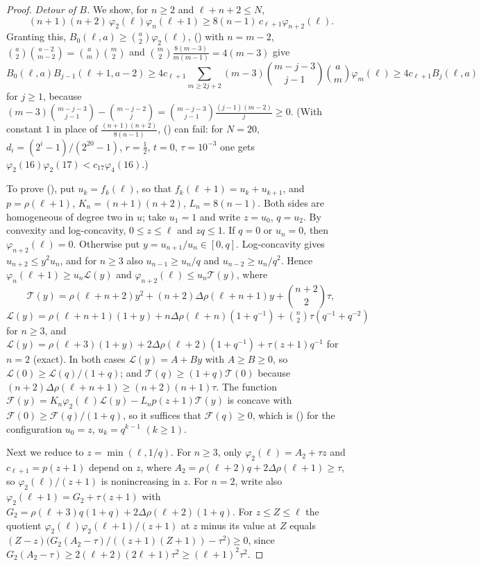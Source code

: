 \documentclass[twoside,10pt]{article}
\numberwithin{equation}{section}
\theoremstyle{slbody}
\theoremstyle{definition}
\theoremstyle{remark}
\renewcommand{\eqref}[1]{\textup{{\normalfont(\oldstylenums{\ref{#1}}}\normalfont)}}
\begin{document}
\begin{proof}
\emph{Detour of $B$.} We show, for $n\geq2$ and $\ell+n+2\leq N$,
\begin{equation}\label{eq:quad-B}
(n+1)(n+2)\,\varphi_2(\ell)\varphi_n(\ell+1)\geq8(n-1)\,c_{\ell+1}\varphi_{n+2}(\ell).
\end{equation}
Granting this, $B_0(\ell,a)\geq\binom a2\varphi_2(\ell)$, \eqref{eq:quad-B} with $n=m-2$, $\binom a2\binom{a-2}{m-2}=\binom am\binom m2$ and $\binom m2\frac{8(m-3)}{m(m-1)}=4(m-3)$ give
\[
B_0(\ell,a)B_{j-1}(\ell+1,a-2)\geq4c_{\ell+1}\sum_{m\geq2j+2}(m-3)\binom{m-j-3}{j-1}\binom am\varphi_m(\ell)\geq4c_{\ell+1}B_j(\ell,a)
\]
for $j\geq1$, because $(m-3)\binom{m-j-3}{j-1}-\binom{m-j-2}j=\binom{m-j-3}{j-1}\frac{(j-1)(m-2)}j\geq0$. (With constant $1$ in place of $\frac{(n+1)(n+2)}{8(n-1)}$, \eqref{eq:quad-B} can fail: for $N=20$, $d_i=(2^i-1)/(2^{20}-1)$, $r=\frac12$, $t=0$, $\tau=10^{-3}$ one gets $\varphi_2(16)\varphi_2(17)<c_{17}\varphi_4(16)$.)

To prove \eqref{eq:quad-B}, put $u_k=f_k(\ell)$, so that $f_k(\ell+1)=u_k+u_{k+1}$, and $p=\rho(\ell+1)$, $K_n=(n+1)(n+2)$, $L_n=8(n-1)$. Both sides are homogeneous of degree two in $u$; take $u_1=1$ and write $z=u_0$, $q=u_2$. By convexity and log-concavity, $0\leq z\leq\ell$ and $zq\leq1$. If $q=0$ or $u_n=0$, then $\varphi_{n+2}(\ell)=0$. Otherwise put $y=u_{n+1}/u_n\in[0,q]$. Log-concavity gives $u_{n+2}\leq y^2u_n$, and for $n\geq3$ also $u_{n-1}\geq u_n/q$ and $u_{n-2}\geq u_n/q^2$. Hence $\varphi_n(\ell+1)\geq u_n\mathcal L(y)$ and $\varphi_{n+2}(\ell)\leq u_n\mathcal T(y)$, where
\[
\mathcal T(y)=\rho(\ell+n+2)y^2+(n+2)\Delta\rho(\ell+n+1)y+\binom{n+2}2\tau,
\]
$\mathcal L(y)=\rho(\ell+n+1)(1+y)+n\Delta\rho(\ell+n)(1+q^{-1})+\binom n2\tau(q^{-1}+q^{-2})$ for $n\geq3$, and $\mathcal L(y)=\rho(\ell+3)(1+y)+2\Delta\rho(\ell+2)(1+q^{-1})+\tau(z+1)q^{-1}$ for $n=2$ (exact). In both cases $\mathcal L(y)=A+By$ with $A\geq B\geq0$, so $\mathcal L(0)\geq\mathcal L(q)/(1+q)$; and $\mathcal T(q)\geq(1+q)\mathcal T(0)$ because $(n+2)\Delta\rho(\ell+n+1)\geq(n+2)(n+1)\tau$. The function $\mathcal F(y)=K_n\varphi_2(\ell)\mathcal L(y)-L_np(z+1)\mathcal T(y)$ is concave with $\mathcal F(0)\geq\mathcal F(q)/(1+q)$, so it suffices that $\mathcal F(q)\geq0$, which is \eqref{eq:quad-B} for the configuration $u_0=z$, $u_k=q^{k-1}$ $(k\geq1)$.

Next we reduce to $z=\min(\ell,1/q)$. For $n\geq3$, only $\varphi_2(\ell)=A_2+\tau z$ and $c_{\ell+1}=p(z+1)$ depend on $z$, where $A_2=\rho(\ell+2)q+2\Delta\rho(\ell+1)\geq\tau$, so $\varphi_2(\ell)/(z+1)$ is nonincreasing in $z$. For $n=2$, write also $\varphi_2(\ell+1)=G_2+\tau(z+1)$ with $G_2=\rho(\ell+3)q(1+q)+2\Delta\rho(\ell+2)(1+q)$. For $z\leq Z\leq\ell$ the quotient $\varphi_2(\ell)\varphi_2(\ell+1)/(z+1)$ at $z$ minus its value at $Z$ equals $(Z-z)\bigl(G_2(A_2-\tau)/((z+1)(Z+1))-\tau^2\bigr)\geq0$, since $G_2(A_2-\tau)\geq2(\ell+2)(2\ell+1)\tau^2\geq(\ell+1)^2\tau^2$.


\end{proof}
\end{document}
